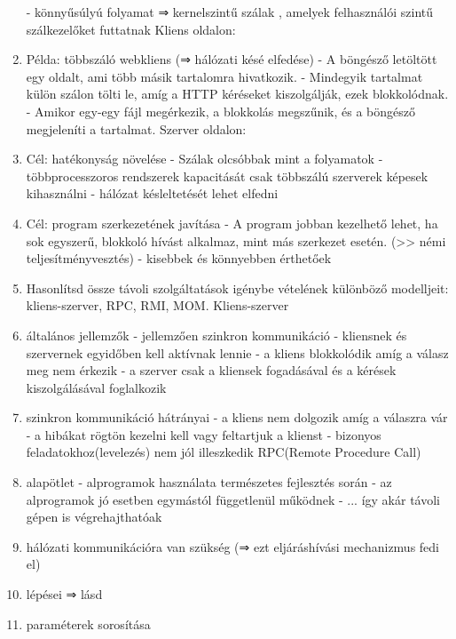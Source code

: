 \documentclass[twoside, a4paper, 12pt]{article}
\begin{document}
\begin{enumerate}
                - könnyűsúlyú folyamat ⇒ kernelszintű szálak , amelyek felhasználói szintű szálkezelőket futtatnak
                Kliens oldalon:
            \item Példa: többszáló webkliens (⇒ hálózati késé elfedése)
                - A böngésző letöltött egy oldalt, ami több másik tartalomra hivatkozik.
                - Mindegyik tartalmat külön szálon tölti le, amíg a HTTP kéréseket kiszolgálják, ezek blokkolódnak.
                - Amikor egy-egy fájl megérkezik, a blokkolás megszűnik, és a böngésző megjeleníti a tartalmat.
                Szerver oldalon:
            \item Cél: hatékonyság növelése
                - Szálak olcsóbbak mint a folyamatok
                - többprocesszoros rendszerek kapacitását csak többszálú szerverek képesek kihasználni
                - hálózat késleltetését lehet elfedni
            \item Cél: program szerkezetének javítása
                - A program jobban kezelhető lehet, ha sok egyszerű, blokkoló hívást alkalmaz, mint más szerkezet esetén. (>> némi teljesítményvesztés)
                - kisebbek és könnyebben érthetőek 
            \item  Hasonlítsd össze távoli szolgáltatások igénybe vételének különböző modelljeit: kliens-szerver, RPC, RMI, MOM.
                Kliens-szerver
            \item általános jellemzők
                - jellemzően szinkron kommunikáció
                - kliensnek és szervernek egyidőben kell aktívnak lennie
                - a kliens blokkolódik amíg a válasz meg nem érkezik
                - a szerver csak a kliensek fogadásával és a kérések kiszolgálásával foglalkozik
            \item szinkron kommunikáció hátrányai
                - a kliens nem dolgozik amíg a válaszra vár
                - a hibákat rögtön kezelni kell vagy feltartjuk a klienst
                - bizonyos feladatokhoz(levelezés) nem jól illeszkedik
                RPC(Remote Procedure Call)
            \item alapötlet
                - alprogramok használata természetes fejlesztés során
                - az alprogramok jó esetben egymástól függetlenül működnek
                - ... így akár távoli gépen is végrehajthatóak
            \item hálózati kommunikációra van szükség (⇒ ezt eljáráshívási mechanizmus fedi el)
            \item lépései ⇒ lásd 
            \item paraméterek sorosítása

\end{enumerate}
\end{document}
